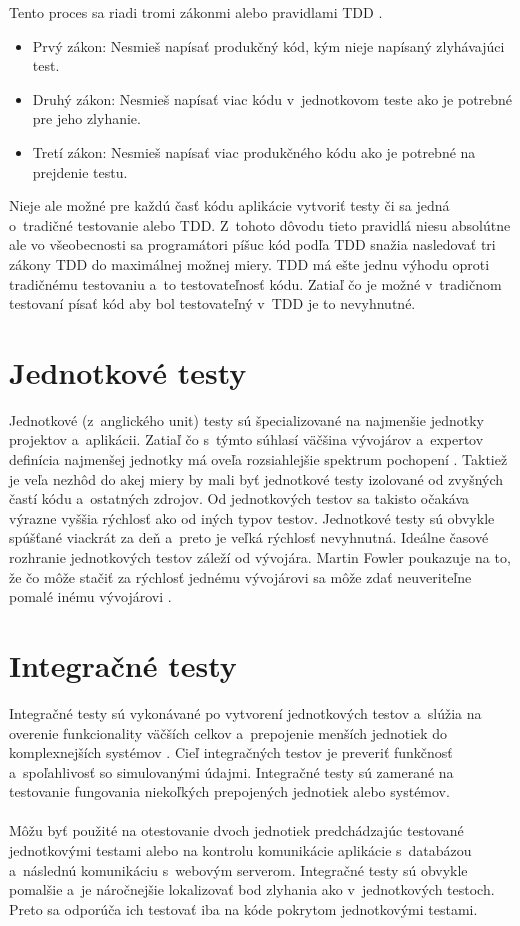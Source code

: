 \documentclass[
  digital, %
  table,   %
oneside,
  nolof,     %
  nolot,     %
]{fithesis3}
\begin{document}
Tento proces sa riadi tromi zákonmi alebo pravidlami TDD \cite{cleanCode}.
\begin{itemize}
	\item Prvý zákon: Nesmieš napísať produkčný kód, kým nieje napísaný zlyhávajúci test.
	\item Druhý zákon: Nesmieš napísať viac kódu v~jednotkovom teste ako je potrebné pre jeho zlyhanie.
	\item Tretí zákon: Nesmieš napísať viac produkčného kódu ako je potrebné na prejdenie testu. 
\end{itemize} 
Nieje ale možné pre každú časť kódu aplikácie vytvoriť testy či sa jedná o~tradičné testovanie alebo TDD. Z~tohoto dôvodu tieto pravidlá niesu absolútne ale vo všeobecnosti sa programátori píšuc kód podľa TDD snažia nasledovať tri zákony TDD do maximálnej možnej miery.
TDD má ešte jednu výhodu oproti tradičnému testovaniu a~to testovateľnosť kódu. Zatiaľ čo je možné v~tradičnom testovaní písať kód aby bol testovateľný v~TDD je to nevyhnutné. 

\section{Jednotkové testy}
Jednotkové (z~anglického unit) testy sú špecializované na najmenšie jednotky projektov a~aplikácii. Zatiaľ čo s~týmto súhlasí väčšina vývojárov a~expertov definícia najmenšej jednotky má oveľa rozsiahlejšie spektrum pochopení \cite{codeMaintability}\cite{effectiveSoftwareTesting}. Taktiež je veľa nezhôd do akej miery by mali byť jednotkové testy izolované od zvyšných častí kódu a~ostatných zdrojov. Od jednotkových testov sa takisto očakáva výrazne vyššia rýchlosť ako od iných typov testov. Jednotkové testy sú obvykle spúšťané viackrát za deň a~preto je veľká rýchlosť nevyhnutná. Ideálne časové rozhranie jednotkových testov záleží od vývojára. Martin Fowler poukazuje na to, že čo môže stačiť za rýchlosť jednému vývojárovi sa môže zdať neuveriteľne pomalé inému vývojárovi \cite{unitTest}.
\section{Integračné testy}
Integračné testy sú vykonávané po vytvorení jednotkových testov a~slúžia na overenie funkcionality väčších celkov a~prepojenie menších jednotiek do komplexnejších systémov \cite{testSeparation}. Cieľ integračných testov je preveriť funkčnosť a~spoľahlivosť so simulovanými údajmi. Integračné testy sú zamerané na testovanie fungovania niekoľkých prepojených jednotiek alebo systémov.\paragraph{}
Môžu byť použité na otestovanie dvoch jednotiek predchádzajúc testované jednotkovými testami alebo na kontrolu komunikácie aplikácie s~databázou a~následnú komunikáciu s~webovým serverom. Integračné testy sú obvykle pomalšie a~je náročnejšie lokalizovať bod zlyhania ako v~jednotkových  testoch. Preto sa odporúča ich testovať iba na kóde pokrytom jednotkovými testami.
\end{document}
